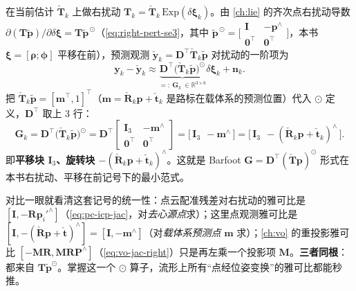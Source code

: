 \begin{derivation}[点观测对位姿的右扰动雅可比]
\label{thm:pc-track-jac}
在当前估计 $\check{\mathbf{T}}_k$ 上做右扰动 $\mathbf{T}_k=\check{\mathbf{T}}_k\,\mathrm{Exp}(\delta\boldsymbol{\xi}_k)$。由 \cref{ch:lie} 的齐次点右扰动导数 $\partial(\mathbf{T}\tilde{\mathbf{p}})/\partial\delta\boldsymbol{\xi}=\mathbf{T}\tilde{\mathbf{p}}^{\,\odot}$（\cref{eq:right-pert-se3}，其中 $\tilde{\mathbf{p}}^{\,\odot}=\big[\begin{smallmatrix}\mathbf{I}&-\mathbf{p}^\wedge\\\mathbf{0}^\top&\mathbf{0}^\top\end{smallmatrix}\big]$，本书 $\boldsymbol{\xi}=[\boldsymbol{\rho};\boldsymbol{\phi}]$ 平移在前），预测观测 $\check{\mathbf{y}}_k=\mathbf{D}^\top\check{\mathbf{T}}_k\tilde{\mathbf{p}}$ 对扰动的一阶项为
\begin{equation}
  \mathbf{y}_k-\check{\mathbf{y}}_k\approx\underbrace{\mathbf{D}^\top\big(\check{\mathbf{T}}_k\tilde{\mathbf{p}}\big)^{\!\odot}}_{=:\ \mathbf{G}_k\ \in\mathbb{R}^{3\times6}}\delta\boldsymbol{\xi}_k+\mathbf{n}_k.
  \label{eq:pc-track-jac}
\end{equation}
把 $\check{\mathbf{T}}_k\tilde{\mathbf{p}}=[\mathbf{m}^\top,1]^\top$（$\mathbf{m}=\check{\mathbf{R}}_k\mathbf{p}+\check{\mathbf{t}}_k$ 是路标在载体系的预测位置）代入 $\odot$ 定义，$\mathbf{D}^\top$ 取上 $3$ 行：
\begin{equation}
  \mathbf{G}_k=\mathbf{D}^\top\big(\check{\mathbf{T}}_k\tilde{\mathbf{p}}\big)^{\!\odot}
  =\mathbf{D}^\top\begin{bmatrix}\mathbf{I}_3 & -\mathbf{m}^\wedge\\ \mathbf{0}^\top & \mathbf{0}^\top\end{bmatrix}
  =\big[\,\mathbf{I}_3\ \ -\mathbf{m}^\wedge\,\big]
  =\big[\,\mathbf{I}_3\ \ -(\check{\mathbf{R}}_k\mathbf{p}+\check{\mathbf{t}}_k)^\wedge\,\big].
  \label{eq:pc-track-G}
\end{equation}
即\textbf{平移块 $\mathbf{I}_3$、旋转块 $-(\check{\mathbf{R}}_k\mathbf{p}+\check{\mathbf{t}}_k)^\wedge$}。这就是 Barfoot $\mathbf{G}=\mathbf{D}^\top(\check{\mathbf{T}}\mathbf{p})^{\odot}$ 形式在本书右扰动、平移在前记号下的最小范式。
\end{derivation}

\begin{insight}
对比一眼就看清这套记号的统一性：点云配准残差对右扰动的雅可比是 $[\mathbf{I},-\mathbf{R}\mathbf{p}_i'^\wedge]$（\cref{eq:pc-icp-jac}，对\emph{去心源点}求）；这里点观测雅可比是 $[\mathbf{I},-(\check{\mathbf{R}}\mathbf{p}+\check{\mathbf{t}})^\wedge]=[\mathbf{I},-\mathbf{m}^\wedge]$（对\emph{载体系预测点} $\mathbf{m}$ 求）；\cref{ch:vo} 的重投影雅可比 $[-\mathbf{M}\mathbf{R},\mathbf{M}\mathbf{R}\mathbf{P}^\wedge]$（\cref{eq:vo-jac-right}）只是再左乘一个投影项 $\mathbf{M}$。\textbf{三者同根}：都来自 $\mathbf{T}\tilde{\mathbf{p}}^{\odot}$。掌握这一个 $\odot$ 算子，流形上所有“点经位姿变换”的雅可比都能秒推。
\end{insight}

